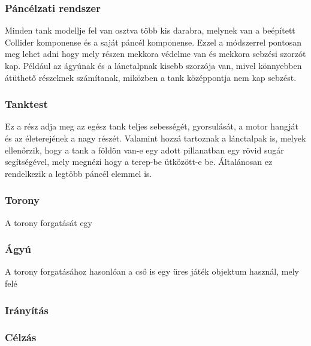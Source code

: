 \documentclass[
]{thesis-ekf}
\theoremstyle{definition}
\theoremstyle{remark}
\begin{document}
\subsubsection{Páncélzati rendszer}
Minden tank modellje fel van osztva több kis darabra, melynek van a beépített Collider komponense és a saját páncél komponense. Ezzel a módszerrel pontosan meg lehet adni hogy mely részen mekkora védelme van és mekkora sebzési szorzót kap. Például az ágyúnak és a lánctalpnak kisebb szorzója van, mivel könnyebben átüthető részeknek számítanak, miközben a tank középpontja nem kap sebzést.

\subsubsection{Tanktest}

Ez a rész adja meg az egész tank teljes sebességét, gyorsulását, a motor hangját és az életerejének a nagy részét. Valamint hozzá tartoznak a lánctalpak is, melyek ellenőrzik, hogy a tank a földön van-e egy adott pillanatban egy rövid sugár segítségével, mely megnézi hogy a terep-be ütközött-e be.  Általánosan ez rendelkezik a legtöbb páncél elemmel is.

\subsubsection{Torony}

A torony forgatását egy



\subsubsection{Ágyú}

A torony forgatásához hasonlóan a cső is egy üres játék objektum használ, mely felé




\subsubsection{Irányítás}



\subsubsection{Célzás}
\end{document}
